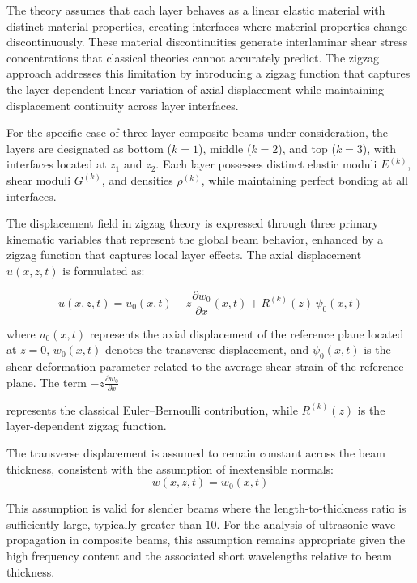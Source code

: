 \documentclass[12pt,a4paper]{report}
\begin{document}
The theory assumes that each layer behaves as a linear elastic material with distinct material properties, creating interfaces where material properties change discontinuously. These material discontinuities generate interlaminar shear stress concentrations that classical theories cannot accurately predict. The zigzag approach addresses this limitation by introducing a zigzag function that captures the layer-dependent linear variation of axial displacement while maintaining displacement continuity across layer interfaces.

For the specific case of three-layer composite beams under consideration, the layers are designated as bottom ($k=1$), middle ($k=2$), and top ($k=3$), with interfaces located at $z_1$ and $z_2$. Each layer possesses distinct elastic moduli $E^{(k)}$, shear moduli $G^{(k)}$, and densities $\rho^{(k)}$, while maintaining perfect bonding at all interfaces.

The displacement field in zigzag theory is expressed through three primary kinematic variables that represent the global beam behavior, enhanced by a zigzag function that captures local layer effects. The axial displacement $u(x,z,t)$ is formulated as:

\begin{equation}
    u(x,z,t) = u_0(x,t) - z \frac{\partial w_0}{\partial x}(x,t) + R^{(k)}(z) \, \psi_0(x,t)
\end{equation}


where \(u_0(x,t)\) represents the axial displacement of the reference plane located at \(z = 0\), \(w_0(x,t)\) denotes the transverse displacement, and \(\psi_0(x,t)\) is the shear deformation parameter related to the average shear strain of the reference plane. The term \(- z \frac{\partial w_0}{\partial x}\)

represents the classical Euler--Bernoulli contribution, while $R^{(k)}(z)$ is the layer-dependent zigzag function.

The transverse displacement is assumed to remain constant across the beam thickness, consistent with the assumption of inextensible normals:
\begin{equation}
   w(x,z,t) = w_0(x,t) 
\end{equation}


This assumption is valid for slender beams where the length-to-thickness ratio is sufficiently large, typically greater than $10$. For the analysis of ultrasonic wave propagation in composite beams, this assumption remains appropriate given the high frequency content and the associated short wavelengths relative to beam thickness.
\end{document}
